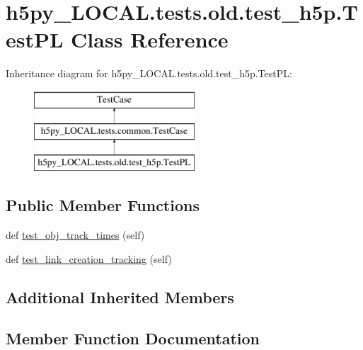 \hypertarget{classh5py__LOCAL_1_1tests_1_1old_1_1test__h5p_1_1TestPL}{}\section{h5py\+\_\+\+L\+O\+C\+A\+L.\+tests.\+old.\+test\+\_\+h5p.\+Test\+PL Class Reference}
\label{classh5py__LOCAL_1_1tests_1_1old_1_1test__h5p_1_1TestPL}
Inheritance diagram for h5py\+\_\+\+L\+O\+C\+A\+L.\+tests.\+old.\+test\+\_\+h5p.\+Test\+PL\+:\begin{figure}[H]
\begin{center}
\leavevmode
\includegraphics[height=3.000000cm]{classh5py__LOCAL_1_1tests_1_1old_1_1test__h5p_1_1TestPL}
\end{center}
\end{figure}
\subsection*{Public Member Functions}
\begin{DoxyCompactItemize}
\item 
def \hyperlink{classh5py__LOCAL_1_1tests_1_1old_1_1test__h5p_1_1TestPL_a1e730b54f209fe7b4c1c1290f645d949}{test\+\_\+obj\+\_\+track\+\_\+times} (self)
\item 
def \hyperlink{classh5py__LOCAL_1_1tests_1_1old_1_1test__h5p_1_1TestPL_a11b1dce5cdec209418d73eb4a2a30891}{test\+\_\+link\+\_\+creation\+\_\+tracking} (self)
\end{DoxyCompactItemize}
\subsection*{Additional Inherited Members}


\subsection{Member Function Documentation}
\mbox{\label{classh5py__LOCAL_1_1tests_1_1old_1_1test__h5p_1_1TestPL_a11b1dce5cdec209418d73eb4a2a30891}} 
